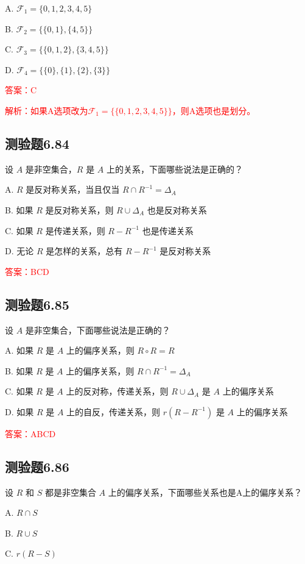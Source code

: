 \documentclass[UTF8, heading=true]{ctexart}
\begin{document}
A. $\mathcal{F}_1=\{0,1,2,3,4,5\}$

B. $\mathcal{F}_2=\{\{0,1\},\{4,5\}\}$

C. $\mathcal{F}_3=\{\{0,1,2\},\{3,4,5\}\}$

D. $\mathcal{F}_4=\{\{0\},\{1\},\{2\},\{3\}\}$

\textcolor{red}{答案：C}

\textcolor{red}{解析：如果A选项改为$\mathcal{F}_1=\{\{0,1,2,3,4,5\}\}$，则A选项也是划分。}

\subsection{测验题6.84}

设 $A$ 是非空集合，$R$ 是 $A$ 上的关系，下面哪些说法是正确的？

A. $R$ 是反对称关系，当且仅当 $R \cap R^{-1}=\Delta_A$

B. 如果 $R$ 是反对称关系，则 $R \cup \Delta_A$ 也是反对称关系

C. 如果 $R$ 是传递关系，则 $R-R^{-1}$ 也是传递关系

D. 无论 $R$ 是怎样的关系，总有 $R-R^{-1}$ 是反对称关系

\textcolor{red}{答案：BCD}

\subsection{测验题6.85}

设 $A$ 是非空集合，下面哪些说法是正确的？

A. 如果 $R$ 是 $A$ 上的偏序关系，则 $R \circ R=R$

B. 如果 $R$ 是 $A$ 上的偏序关系，则 $R \cap R^{-1}=\Delta_A$

C. 如果 $R$ 是 $A$ 上的反对称，传递关系，则 $R \cup \Delta_A$ 是 $A$ 上的偏序关系

D. 如果 $R$ 是 $A$ 上的自反，传递关系，则 $r\left(R-R^{-1}\right)$ 是 $A$ 上的偏序关系


\textcolor{red}{答案：ABCD}


\subsection{测验题6.86}

设 $R$ 和 $S$ 都是非空集合 $A$ 上的偏序关系，下面哪些关系也是A上的偏序关系？

A. $R \cap S$

B. $R \cup S$

C. $r(R-S)$
\end{document}
